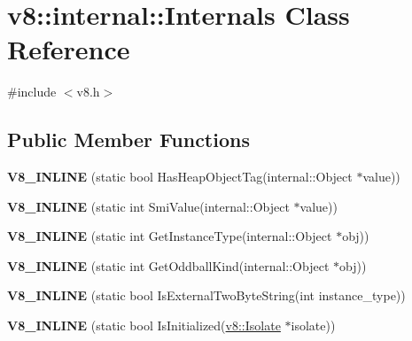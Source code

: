 \hypertarget{classv8_1_1internal_1_1_internals}{}\section{v8\+:\+:internal\+:\+:Internals Class Reference}
\label{classv8_1_1internal_1_1_internals}


{\ttfamily \#include $<$v8.\+h$>$}

\subsection*{Public Member Functions}
\begin{DoxyCompactItemize}
\item 
\hypertarget{classv8_1_1internal_1_1_internals_a52f44fc3c5e19b1caa2acaa066f32632}{}{\bfseries V8\+\_\+\+I\+N\+L\+I\+N\+E} (static bool Has\+Heap\+Object\+Tag(internal\+::\+Object $\ast$value))\label{classv8_1_1internal_1_1_internals_a52f44fc3c5e19b1caa2acaa066f32632}

\item 
\hypertarget{classv8_1_1internal_1_1_internals_a7d7e7480933a759c01abac08bd6381aa}{}{\bfseries V8\+\_\+\+I\+N\+L\+I\+N\+E} (static int Smi\+Value(internal\+::\+Object $\ast$value))\label{classv8_1_1internal_1_1_internals_a7d7e7480933a759c01abac08bd6381aa}

\item 
\hypertarget{classv8_1_1internal_1_1_internals_a1114867607d59c883c27ac4f1a2d8f3a}{}{\bfseries V8\+\_\+\+I\+N\+L\+I\+N\+E} (static int Get\+Instance\+Type(internal\+::\+Object $\ast$obj))\label{classv8_1_1internal_1_1_internals_a1114867607d59c883c27ac4f1a2d8f3a}

\item 
\hypertarget{classv8_1_1internal_1_1_internals_af5f5ae125fa4e6e8a9465a70cda31ae3}{}{\bfseries V8\+\_\+\+I\+N\+L\+I\+N\+E} (static int Get\+Oddball\+Kind(internal\+::\+Object $\ast$obj))\label{classv8_1_1internal_1_1_internals_af5f5ae125fa4e6e8a9465a70cda31ae3}

\item 
\hypertarget{classv8_1_1internal_1_1_internals_a8669706ae5c335380476712690905e3c}{}{\bfseries V8\+\_\+\+I\+N\+L\+I\+N\+E} (static bool Is\+External\+Two\+Byte\+String(int instance\+\_\+type))\label{classv8_1_1internal_1_1_internals_a8669706ae5c335380476712690905e3c}

\item 
\hypertarget{classv8_1_1internal_1_1_internals_ade46ce787cf0135bde4fe6a9a1c59fdf}{}{\bfseries V8\+\_\+\+I\+N\+L\+I\+N\+E} (static bool Is\+Initialized(\hyperlink{classv8_1_1_isolate}{v8\+::\+Isolate} $\ast$isolate))\label{classv8_1_1internal_1_1_internals_ade46ce787cf0135bde4fe6a9a1c59fdf}


\end{DoxyCompactItemize}
